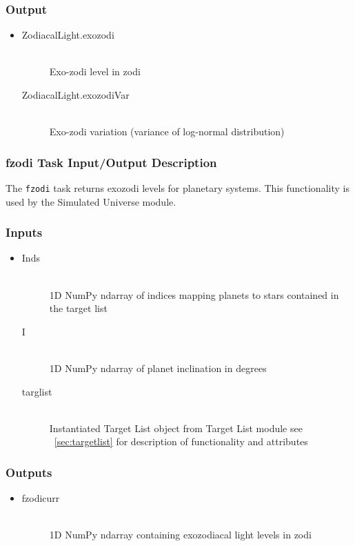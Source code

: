 \documentclass[cleanfoot]{asme2ej}
\begin{document}
\subsubsection*{Output}
\begin{itemize}
    \item 
    \begin{description}
        \item[ZodiacalLight.exozodi] \hfill \\
        Exo-zodi level in zodi
        \item[ZodiacalLight.exozodiVar] \hfill \\
        Exo-zodi variation (variance of log-normal distribution)
    \end{description}
\end{itemize}

\subsubsection{fzodi Task Input/Output Description} \label{sec:fzoditask}
The \verb+fzodi+ task returns exozodi levels for planetary systems.  This functionality is used by the Simulated Universe module.

\subsubsection*{Inputs}
\begin{itemize}
    \item 
    \begin{description}
        \item[Inds] \hfill \\
        1D NumPy ndarray of indices mapping planets to stars contained in the target list
        \item[I] \hfill \\
        1D NumPy ndarray of planet inclination in degrees
        \item[targlist] \hfill \\
        Instantiated Target List object from Target List module see ~\ref{sec:targetlist} for description of functionality and attributes
    \end{description}
\end{itemize}

\subsubsection*{Outputs}
\begin{itemize}
    \item 
    \begin{description}
        \item[fzodicurr] \hfill \\
        1D NumPy ndarray containing exozodiacal light levels in zodi
    \end{description}
\end{itemize}
\end{document}
